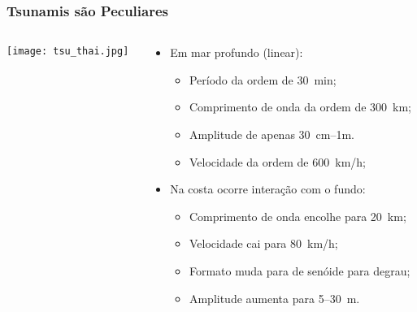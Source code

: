 \documentclass{beamer}
\begin{document}
\begin{frame}
  \frametitle{Tsunamis são Peculiares}
  \begin{columns}
    \begin{column}{0.2\paperwidth} 
      \texttt{[image: tsu\_thai.jpg]}
    \end{column}
    \begin{column}{0.8\paperwidth} 
      \begin{itemize}\setlength{\itemsep}{2.5ex}
      \item Em mar profundo (linear):
        \begin{itemize}\setlength{\itemsep}{1.5ex}
        \item Período da ordem de 30~min;
        \item Comprimento de onda da ordem de 300~km;
        \item Amplitude de apenas 30~cm--1m.
        \item \alert{Velocidade da ordem de 600~km/h;}
        \end{itemize}
      \item Na costa ocorre interação com o fundo: 
        \begin{itemize}\setlength{\itemsep}{1.5ex}
        \item Comprimento de onda encolhe para 20~km;
        \item Velocidade cai para 80~km/h;
        \item Formato muda para de senóide para degrau; 
        \item \alert{Amplitude aumenta para 5--30~m.}
        \end{itemize}
      \end{itemize}
    \end{column}
  \end{columns}
\end{frame}
\end{document}
